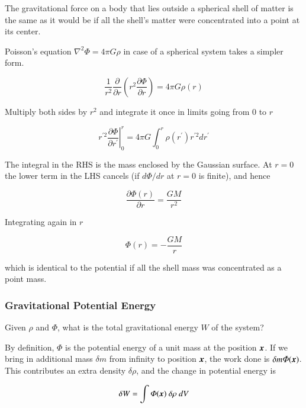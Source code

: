 The gravitational force on a body that lies outside a spherical shell of matter is the same as it would be if all the shell's matter were concentrated into a point at its center. 

Poisson's equation $\nabla^2\varPhi=  4\pi G \rho$ in case of a spherical system takes a simpler form.

\begin{equation}
\frac{1}{r^2}\frac{\partial}{\partial r} \left( r^2 \frac{\partial \varPhi}{\partial r} \right) = 4\pi G \rho(r)
\end{equation}

Multiply both sides by $r^2$ and integrate it once in limits going from $0$ to $r$

\begin{equation}
\left. r^{\prime 2} \frac{\partial \varPhi}{\partial r^\prime} \right\vert_0^{r} = 4\pi G \int_0^r \rho(r^\prime) r^{\prime 2} dr^\prime 
\end{equation}

The integral in the RHS is the mass enclosed by the Gaussian surface. At $r=0$ the lower term in the LHS cancels (if $d\varPhi/dr$ at $r=0$ is finite), and hence

\begin{equation}
\frac{\partial \varPhi(r)}{\partial r}  = \frac{GM}{r^2} 
\end{equation}

Integrating again in $r$

\begin{equation}
\varPhi(r) = -\frac{GM}{r}
\end{equation}

which is identical to the potential if all the shell mass was concentrated as a point mass.


\subsubsection{Gravitational Potential Energy}

Given $\rho$ and $\varPhi$, what is the total gravitational energy $W$ of the system?

By definition, $\varPhi$ is the potential energy of a unit mass at the position ${\boldsymbol{x}}$. If we bring in additional mass $\delta m$ from infinity to position ${\boldsymbol{x}}$, the work done is $\delta m \varPhi({\boldsymbol{x}})$. This contributes an extra density $\delta \rho$, and the change in potential energy is 

\begin{equation}
\delta W =  \int \varPhi({\boldsymbol{x}}) \ \delta \rho \ dV
\end{equation}

